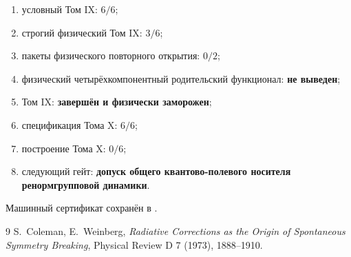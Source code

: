 \begin{protocol}\begin{enumerate}
\item условный Том IX: \textbf{$6/6$};
\item строгий физический Том IX: \textbf{$3/6$};
\item пакеты физического повторного открытия: \textbf{$0/2$};
\item физический четырёхкомпонентный родительский функционал: \textbf{не выведен};
\item Том IX: \textbf{завершён и физически заморожен};
\item спецификация Тома X: \textbf{$6/6$};
\item построение Тома X: \textbf{$0/6$};
\item следующий гейт: \textbf{допуск общего квантово-полевого носителя
ренормгрупповой динамики}.
\end{enumerate}\end{protocol}

Машинный сертификат сохранён в
.

\begin{thebibliography}{9}
S.~Coleman, E.~Weinberg,
\emph{Radiative Corrections as the Origin of Spontaneous Symmetry Breaking},
Physical Review D 7 (1973), 1888--1910.
\end{thebibliography}